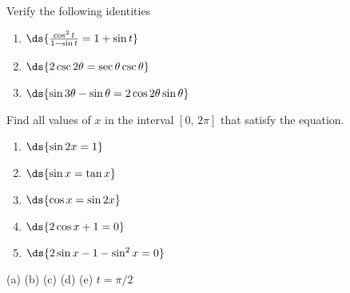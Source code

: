 \begin{enumialphparenastyle}
\begin{multicols}{2}
\begin{ex} Verify the following identities
 \begin{enumerate}
	\item	$\ds{\frac{\cos^2 t }{1-\sin t } = 1+\sin t }$
	\item	$\ds{2\csc 2\theta=\sec \theta \csc \theta} $
	\item	$\ds{\sin 3\theta - \sin \theta  = 2\cos 2\theta\sin \theta}$
\end{enumerate}
\end{ex}



\begin{ex} Find all values of $x$ in the interval $[0, \, 2\pi]$ that satisfy the equation.\\
\begin{multicols}{2}
	\begin{enumerate}
		\item $\ds{\sin 2x =1}$ 
	    \item $\ds{\sin x = \tan x}$
	    \item $\ds{\cos x = \sin 2x}$ 
	    \item $\ds{2\cos x + 1 =0}$
	     \item $\ds{2\sin x -1 -\sin^2 x = 0}$ 
	 \end{enumerate}
\end{multicols}	 
\begin{sol}
 (a)  (b) (c) (d) (e) $t=\pi/2$
\end{sol}
\end{ex}

\end{multicols}

\end{enumialphparenastyle}
